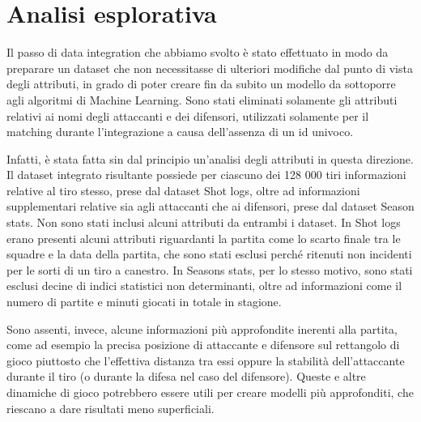 \section{Analisi esplorativa}

Il passo di data integration che abbiamo svolto è stato effettuato in modo da preparare un dataset che non necessitasse di ulteriori modifiche dal punto di vista degli attributi, in grado di poter creare fin da subito un modello da sottoporre agli algoritmi di Machine Learning. Sono stati eliminati solamente gli attributi relativi ai nomi degli attaccanti e dei difensori, utilizzati solamente per il matching durante l’integrazione a causa dell’assenza di un id univoco.

\par
Infatti, è stata fatta sin dal principio un’analisi degli attributi in questa direzione. Il dataset integrato risultante possiede per ciascuno dei 128 000 tiri informazioni relative al tiro stesso, prese dal dataset Shot logs, oltre ad informazioni supplementari relative sia agli attaccanti che ai difensori, prese dal dataset Season stats. Non sono stati inclusi alcuni attributi da entrambi i dataset. In Shot logs erano presenti alcuni attributi riguardanti la partita come lo scarto finale tra le squadre e la data della partita, che sono stati esclusi perché ritenuti non incidenti per le sorti di un tiro a canestro. In Seasons stats, per lo stesso motivo, sono stati esclusi decine di indici statistici non determinanti, oltre ad informazioni come il numero di partite e minuti giocati in totale in stagione.

\par
Sono assenti, invece, alcune informazioni più approfondite inerenti alla partita, come ad esempio la precisa posizione di attaccante e difensore sul rettangolo di gioco piuttosto che l’effettiva distanza tra essi oppure la stabilità dell’attaccante durante il tiro (o durante la difesa nel caso del difensore). Queste e altre dinamiche di gioco potrebbero essere utili per creare modelli più approfonditi, che riescano a dare risultati meno superficiali.
